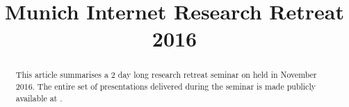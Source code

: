\documentclass{sigcomm-alternate}
\begin{document}
\title{Munich Internet Research Retreat 2016}


\maketitle

\begin{abstract}

This article summarises a 2 day long research retreat seminar on  held in
November 2016.  The entire set of presentations delivered during the seminar
is made publicly available at \cite{mir-materials}.

\end{abstract}
\end{document}

